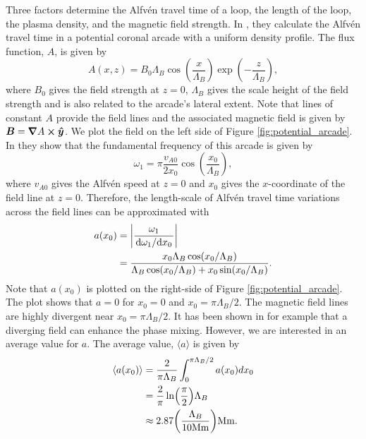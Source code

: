 Three factors determine the Alfv\'en travel time of a loop, the length of the loop, the plasma density, and the magnetic field strength. In \citet{Oliver1993}, they calculate the Alfv\'en travel time in a potential coronal arcade with a uniform density profile. The flux function, $A$, is given by
\begin{equation}
    \label{eq:potential_aracde_flux_function}
    A(x,z) = B_0\Lambda_B\cos(\frac{x}{\Lambda_B})\exp(-\frac{z}{\Lambda_B}),
\end{equation}
where $B_0$ gives the field strength at $z=0$, $\Lambda_B$ gives the scale height of the field strength and is also related to the arcade's lateral extent. Note that lines of constant $A$ provide the field lines and the associated magnetic field is given by $\boldsymbol{B}=\grad{A}\cross\boldsymbol{\hat{y}}$. We plot the field on the left side of Figure \ref{fig:potential_arcade}. In \citet{Oliver1993} they show that the fundamental frequency of this arcade is given by
\begin{equation}
    \omega_1 = \pi\frac{v_{A0}}{2x_0}\cos(\frac{x_0}{\Lambda_B}),
\end{equation}
where $v_{A0}$ gives the Alfv\'en speed at $z=0$ and $x_0$ gives the $x$-coordinate of the field line at $z=0$. Therefore, the length-scale of Alfv\'en travel time variations across the field lines can be approximated with
\begin{equation}
    \begin{aligned}
    a(x_0) &= \abs{\frac{\omega_1}{\dv*{\omega_1}{x_0}}} \\
    &= \frac{x_0\Lambda_B\cos(x_0/\Lambda_B)}{\Lambda_B\cos(x_0/\Lambda_B)+x_0\sin(x_0/\Lambda_B)}.
    \end{aligned}
\end{equation}
Note that $a(x_0)$ is plotted on the right-side of Figure \ref{fig:potential_arcade}. The plot shows that $a = 0$ for $x_0=0$ and $x_0=\pi\Lambda_B/2$.  The magnetic field lines are highly divergent near $x_0=\pi\Lambda_B/2$. It has been shown in for example \citet{Smith2007} that a diverging field can enhance the phase mixing. However, we are interested in an average value for $a$. The average value, $\langle a \rangle$ is given by
\begin{equation}
\begin{aligned}
    \langle a(x_0) \rangle &= \frac{2}{\pi\Lambda_B}\int_0^{\pi\Lambda_B/2}a(x_0)dx_0 \\
    &= \frac{2}{\pi}\ln(\frac{\pi}{2})\Lambda_B \\
    &\approx 2.87\qty(\frac{\Lambda_B}{10\si{.Mm}}) \si{.Mm}.
\end{aligned}
\end{equation}

